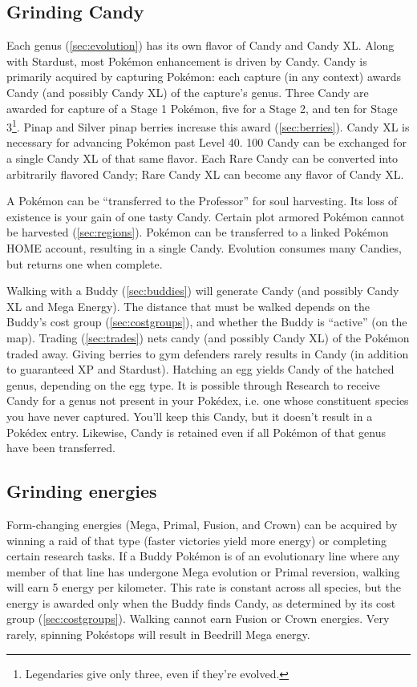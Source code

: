 \subsection{Grinding Candy\label{subsec:getcandy}}
Each genus (\autoref{sec:evolution}) has its own flavor of Candy and Candy XL\@.
Along with Stardust, most Pokémon enhancement is driven by Candy.
Candy is primarily acquired by capturing Pokémon: each capture (in any context)
  awards Candy (and possibly Candy XL) of the capture's genus.
Three Candy are awarded for capture of a Stage 1 Pokémon, five for a Stage 2,
  and ten for Stage 3\footnote{Legendaries give only three, even if they're evolved.}.
Pinap and Silver pinap berries increase this award (\autoref{sec:berries}).
Candy XL is necessary for advancing Pokémon past Level 40.
100 Candy can be exchanged for a single Candy XL of that same flavor.
Each Rare Candy can be converted into arbitrarily flavored Candy; Rare Candy XL can become any flavor of Candy XL\@.

A Pokémon can be ``transferred to the Professor'' for soul harvesting.
Its loss of existence is your gain of one tasty Candy.
Certain plot armored Pokémon cannot be harvested (\autoref{sec:regions}).
Pokémon can be transferred to a linked Pokémon HOME account, resulting in a single Candy.
Evolution consumes many Candies, but returns one when complete.

Walking with a Buddy (\autoref{sec:buddies}) will generate Candy (and possibly Candy XL and Mega Energy).
The distance that must be walked depends on the Buddy's cost group (\autoref{sec:costgroups}),
 and whether the Buddy is ``active'' (on the map).
Trading (\autoref{sec:trades}) nets candy (and possibly Candy XL) of the Pokémon traded away.
Giving berries to gym defenders rarely results in Candy (in addition to guaranteed XP and Stardust).
Hatching an egg yields Candy of the hatched genus, depending on the egg type.
It is possible through Research to receive Candy for a genus not present in
  your Pokédex, i.e. one whose constituent species you have never captured.
You'll keep this Candy, but it doesn't result in a Pokédex entry.
Likewise, Candy is retained even if all Pokémon of that genus have been transferred.
\subsection{Grinding energies}
Form-changing energies (Mega, Primal, Fusion, and Crown) can be acquired by winning a raid of that type
  (faster victories yield more energy) or completing certain research tasks.
If a Buddy Pokémon is of an evolutionary line where any member of that line has undergone Mega evolution
  or Primal reversion, walking will earn 5 energy per kilometer.
This rate is constant across all species, but the energy is awarded only when the Buddy finds Candy,
  as determined by its cost group (\autoref{sec:costgroups}).
Walking cannot earn Fusion or Crown energies.
Very rarely, spinning Pokéstops will result in Beedrill Mega energy.

